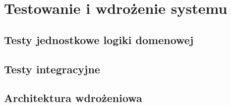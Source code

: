 \chapter{Testowanie i wdrożenie systemu}

\section{Testy jednostkowe logiki domenowej}
\sectionanchor

\section{Testy integracyjne}
\sectionanchor

\section{Architektura wdrożeniowa}
\sectionanchor
